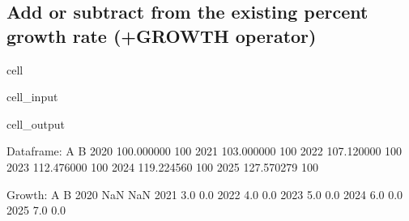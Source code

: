 \documentclass[letterpaper,10pt,english]{jupyterBook}
\begin{document}
\subsection{Add or subtract from the existing percent growth rate (+GROWTH operator)}
\label{\detokenize{content/04_PythonEssentials/UpdateCommand:add-or-subtract-from-the-existing-percent-growth-rate-growth-operator}}
\begin{sphinxuseclass}{cell}\begin{sphinxVerbatimInput}

\begin{sphinxuseclass}{cell_input}
\begin{sphinxVerbatim}[commandchars=\\\{\}]
 
\end{sphinxVerbatim}

\end{sphinxuseclass}\end{sphinxVerbatimInput}
\begin{sphinxVerbatimOutput}

\begin{sphinxuseclass}{cell_output}
\begin{sphinxVerbatim}[commandchars=\\\{\}]
Dataframe:
               A    B
2020  100.000000  100
2021  103.000000  100
2022  107.120000  100
2023  112.476000  100
2024  119.224560  100
2025  127.570279  100

Growth:
        A    B
2020  NaN  NaN
2021  3.0  0.0
2022  4.0  0.0
2023  5.0  0.0
2024  6.0  0.0
2025  7.0  0.0
\end{sphinxVerbatim}

\end{sphinxuseclass}\end{sphinxVerbatimOutput}

\end{sphinxuseclass}
\end{document}
